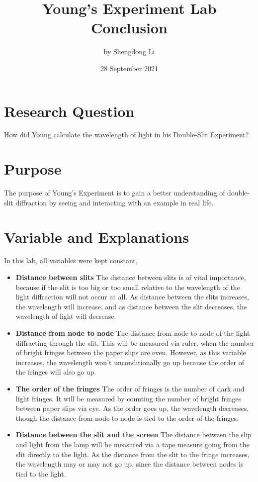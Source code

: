 \documentclass[12pt]{article}
\begin{document}
\title{Young's Experiment Lab Conclusion}
\author{by Shengdong Li}
\date{28 September 2021}
\maketitle

\section{Research Question}

How did Young calculate the wavelength of light in his Double-Slit Experiment?

\section{Purpose}

The purpose of Young's Experiment is to gain a better understanding of double-slit diffraction by seeing and interacting with an example in real life.

\section{Variable and Explanations}

In this lab, all variables were kept constant.

\begin{itemize}
	\item \textbf{Distance between slits} The distance between slits is of vital importance, because if the slit is too big or too small relative to the wavelength of the light diffraction will not occur at all. As distance between the slits increases, the wavelength will increase, and as distance between the slit decreases, the wavelength of light will decrease.
	\item \textbf{Distance from node to node} The distance from node to node of the light diffracting through the slit. This will be measured via ruler, when the number of bright fringes between the paper slips are even. However, as this variable increases, the wavelength won't unconditionally go up because the order of the fringes will also go up.
	\item \textbf{The order of the fringes} The order of fringes is the number of dark and light fringes. It will be measured by counting the number of bright fringes between paper slips via eye. As the order goes up, the wavelength decreases, though the distance from node to node is tied to the order of the fringes.
	\item \textbf{Distance between the slit and the screen} The distance between the slip and light from the lamp will be measured via a tape measure going from the slit directly to the light. As the distance from the slit to the fringe increases, the wavelength may or may not go up, since the distance between nodes is tied to the light.
\end{itemize}
\end{document}
